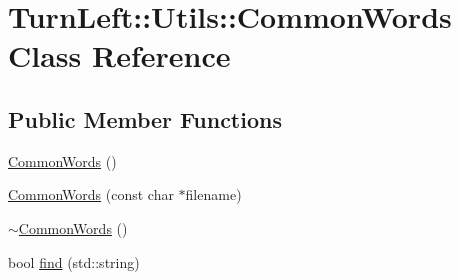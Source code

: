 \hypertarget{classTurnLeft_1_1Utils_1_1CommonWords}{
\section{TurnLeft::Utils::CommonWords Class Reference}
\label{classTurnLeft_1_1Utils_1_1CommonWords}
}
\subsection*{Public Member Functions}
\begin{DoxyCompactItemize}
\item 
\hyperlink{classTurnLeft_1_1Utils_1_1CommonWords_a5fd443eff06ae619cfa2f6191e4e1959}{CommonWords} ()
\item 
\hyperlink{classTurnLeft_1_1Utils_1_1CommonWords_ae9799b4dcea1caa3f13263ddfcb17a2d}{CommonWords} (const char $\ast$filename)
\item 
\hyperlink{classTurnLeft_1_1Utils_1_1CommonWords_a1e016e619f21c72f00967572956be10e}{$\sim$CommonWords} ()
\item 
bool \hyperlink{classTurnLeft_1_1Utils_1_1CommonWords_a17fd3176d631231bfdc9007ea27d3dcd}{find} (std::string)
\end{DoxyCompactItemize}


